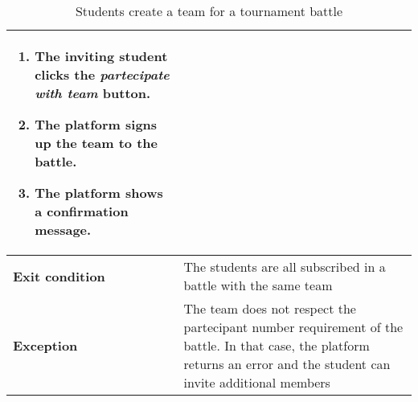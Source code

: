 \begin{enumerate}[label=\textbf{UC\arabic*}:,leftmargin=1.3cm]
\begin{table}[H]
\begin{tabular}{|l|p{11.9cm}|}
\begin{enumerate}[label=\arabic*.]
                              \item The inviting student clicks the \emph{partecipate with team} button.
                              \item The platform signs up the team to the battle.
                              \item The platform shows a confirmation message.
                        \end{enumerate}                    \\\hline
                        \textbf{Exit condition}  & The students are all subscribed in a battle with the same team              \\\hline
                        \textbf{Exception}       & The team does not respect the partecipant number requirement of the battle.
                        In that case, the platform returns an error and the student can invite additional members              \\\hline
                  \end{tabular}
                  \caption{Students create a team for a tournament battle}
                  \label{table:Students create a team for a tournament battle}
            \end{table}
            \pagebreak


\end{enumerate}
